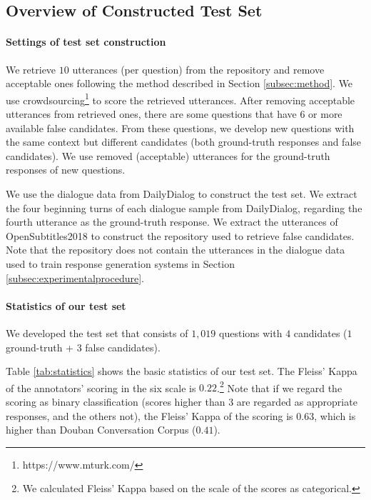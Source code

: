 \documentclass[11pt,a4paper]{article}
\begin{document}
\subsection{Overview of Constructed Test Set}

\paragraph{Settings of test set construction}
We retrieve $10$ utterances (per question) from the repository and remove acceptable ones following the method described in Section \ref{subsec:method}.
We use crowdsourcing\footnote{https://www.mturk.com/} to score the retrieved utterances.
After removing acceptable utterances from retrieved ones, there are some questions that have $6$ or more available false candidates.
From these questions, we develop new questions with the same context but different  candidates (both ground-truth responses and false candidates).
We use removed (acceptable) utterances for the ground-truth responses of new questions.



We use the dialogue data from DailyDialog \cite{li-etal-2017-dailydialog} to construct the test set. We extract the four beginning turns of each dialogue sample from DailyDialog, regarding the fourth utterance as the ground-truth response.
We extract the utterances of OpenSubtitles2018 \cite{lison-etal-2018-opensubtitles2018} to construct the repository used to retrieve false candidates.
Note that the repository does not contain the utterances in the dialogue data used to train response generation systems in Section \ref{subsec:experimentalprocedure}.



\paragraph{Statistics of our test set}
We developed the test set that consists of $1,019$ questions with $4$ candidates ($1$ ground-truth + $3$ false candidates).

Table \ref{tab:statistics} shows the basic statistics of our test set.
%
The Fleiss' Kappa \cite{Fleiss71} of the annotators' scoring in the six scale is $0.22$.\footnote{We calculated Fleiss’ Kappa based on the scale of the scores as categorical.}
Note that if we regard the scoring as binary classification (scores higher than $3$ are regarded as appropriate responses, and the others not), the Fleiss' Kappa of the scoring is $0.63$, which is higher than Douban Conversation Corpus ($0.41$).
\end{document}
